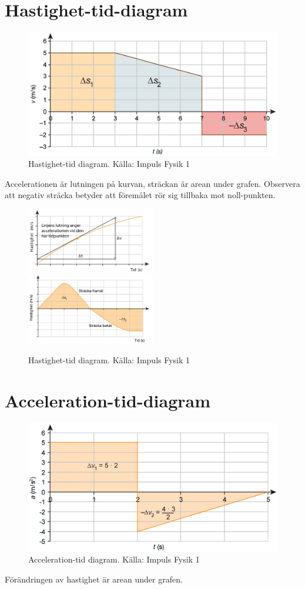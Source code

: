 \documentclass[11pt]{article}
\begin{document}
    \section{Hastighet-tid-diagram}
    \begin{figure}[!h]
        \includegraphics[width=\textwidth]{images/chapter3/velocityTime.png}
        \caption{Hastighet-tid diagram. Källa: Impuls Fysik 1}
    \end{figure}
    Accelerationen är lutningen på kurvan, sträckan är arean under grafen. Observera att negativ sträcka betyder att
    föremålet rör sig tillbaka mot noll-punkten.
    \begin{figure}[!h]
        \includegraphics[width=0.5\textwidth]{images/chapter3/velocityTimeAcceleration.png}
        \includegraphics[width=0.5\textwidth]{images/chapter3/velocityTimeDist.png}
        \caption{Hastighet-tid diagram. Källa: Impuls Fysik 1}
    \end{figure}
    \clearpage
    \section{Acceleration-tid-diagram}
    \begin{figure}[!h]
        \includegraphics[width=\textwidth]{images/chapter3/accelerationTime.png}
        \caption{Acceleration-tid diagram. Källa: Impuls Fysik 1}
    \end{figure}
    Förändringen av hastighet är arean under grafen.
    \clearpage
\end{document}
